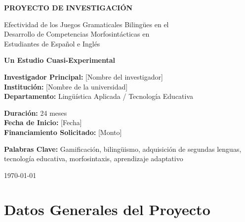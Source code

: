 \documentclass[12pt,a4paper]{article}
\begin{document}
\begin{titlepage}
    \begin{center}
        \vspace*{1cm}
        
        \Huge
        \textbf{PROYECTO DE INVESTIGACIÓN}
        
        \vspace{0.5cm}
        \LARGE
        Efectividad de los Juegos Gramaticales Bilingües en el\\
        Desarrollo de Competencias Morfosintácticas en\\
        Estudiantes de Español e Inglés
        
        \vspace{1.5cm}
        
        \textbf{Un Estudio Cuasi-Experimental}
        
        \vspace{2cm}
        
        \Large
        \textbf{Investigador Principal:} [Nombre del investigador]\\
        \textbf{Institución:} [Nombre de la universidad]\\
        \textbf{Departamento:} Lingüística Aplicada / Tecnología Educativa
        
        \vspace{2cm}
        
        \large
        \textbf{Duración:} 24 meses\\
        \textbf{Fecha de Inicio:} [Fecha]\\
        \textbf{Financiamiento Solicitado:} [Monto]
        
        \vspace{1cm}
        
        \textbf{Palabras Clave:} Gamificación, bilingüismo, adquisición de segundas lenguas, tecnología educativa, morfosintaxis, aprendizaje adaptativo
        
        \vfill
        
        \today
    \end{center}
\end{titlepage}

\newpage
\tableofcontents
\newpage

\section{Datos Generales del Proyecto}
\end{document}
